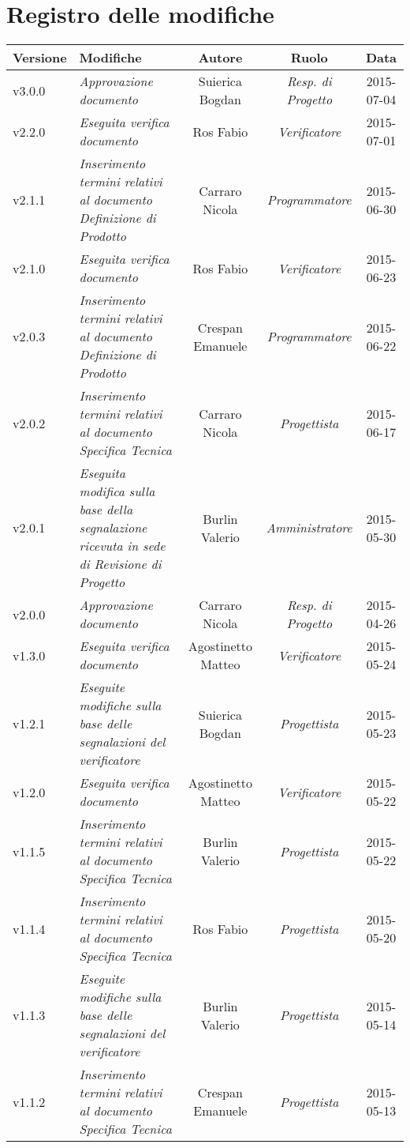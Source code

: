 \newpage
\section*{Registro delle modifiche}

\begin{table}[h]
\centering
\begin{tabular}{|p{}|p{}|c|c|c|}
	\toprule
		\textbf{Versione} & \textbf{Modifiche} & \textbf{Autore} & \textbf{Ruolo} & \textbf{Data} \\
	\midrule
	\midrule
		v3.0.0 & \textit{Approvazione documento} & Suierica Bogdan & \textit{Resp. di Progetto} & 2015-07-04\\
	\midrule
		v2.2.0 & \textit{Eseguita verifica documento} & Ros Fabio & \textit{Verificatore} & 2015-07-01\\
	\midrule
		v2.1.1 & \textit{Inserimento termini relativi al documento Definizione di Prodotto} & Carraro Nicola & \textit{Programmatore} & 2015-06-30\\
	\midrule
		v2.1.0 & \textit{Eseguita verifica documento} & Ros Fabio & \textit{Verificatore} & 2015-06-23\\
	\midrule
		v2.0.3 & \textit{Inserimento termini relativi al documento Definizione di Prodotto} & Crespan Emanuele & \textit{Programmatore} & 2015-06-22\\
	\midrule
		v2.0.2 & \textit{Inserimento termini relativi al documento Specifica Tecnica} & Carraro Nicola & \textit{Progettista} & 2015-06-17\\
	\midrule
		v2.0.1 & \textit{Eseguita modifica sulla base della segnalazione ricevuta in sede di Revisione di Progetto} & Burlin Valerio & \textit{Amministratore} & 2015-05-30\\
	\midrule
		v2.0.0 & \textit{Approvazione documento} & Carraro Nicola & \textit{Resp. di Progetto} & 2015-04-26\\
	\midrule
		v1.3.0 & \textit{Eseguita verifica documento} & Agostinetto Matteo & \textit{Verificatore} & 2015-05-24\\
	\midrule
		v1.2.1 & \textit{Eseguite modifiche sulla base delle segnalazioni del verificatore} & Suierica Bogdan & \textit{Progettista} & 2015-05-23\\
	\midrule
		v1.2.0 & \textit{Eseguita verifica documento} & Agostinetto Matteo & \textit{Verificatore} & 2015-05-22\\
	\midrule
		v1.1.5 & \textit{Inserimento termini relativi al documento Specifica Tecnica} & Burlin Valerio & \textit{Progettista} & 2015-05-22\\
	\midrule
		v1.1.4 & \textit{Inserimento termini relativi al documento Specifica Tecnica} & Ros Fabio & \textit{Progettista} & 2015-05-20\\
	\midrule
		v1.1.3 & \textit{Eseguite modifiche sulla base delle segnalazioni del verificatore} & Burlin Valerio & \textit{Progettista} & 2015-05-14\\
	\midrule
		v1.1.2 & \textit{Inserimento termini relativi al documento Specifica Tecnica} & Crespan Emanuele & \textit{Progettista} & 2015-05-13\\
	\bottomrule
\end{tabular}	
\end{table}

